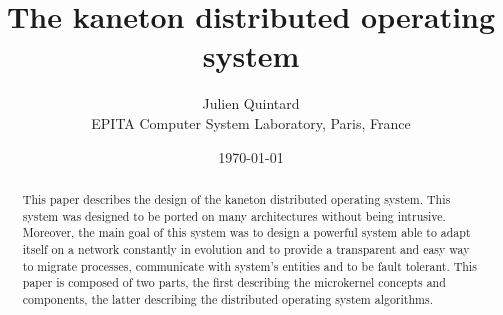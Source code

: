 \documentclass[10pt,a4wide]{article}
\title{The kaneton distributed operating system}
\author{\small{Julien Quintard} \\
        \scriptsize{EPITA Computer System Laboratory, Paris, France}}
\date{\scriptsize{\today}}
\begin{document}
\maketitle


\begin{abstract}

This paper describes the design of the kaneton distributed operating system.
This system was designed to be ported on many architectures without being
intrusive. Moreover, the main goal of this system was to design a powerful
system able to adapt itself on a network constantly in evolution and to
provide a transparent and easy way to migrate processes, communicate
with system's entities and to be fault tolerant. This paper is composed of
two parts, the first describing the microkernel concepts and components,
the latter describing the distributed operating system algorithms.

\end{abstract}

%
%
\end{document}
